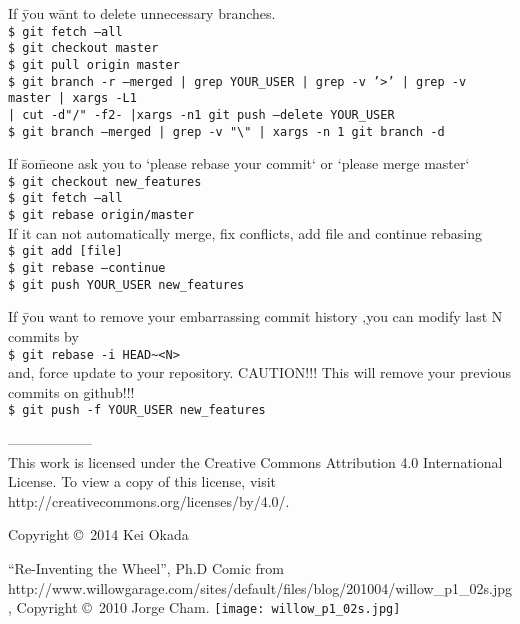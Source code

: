 \documentclass[10pt,landscape]{article}
\begin{document}
\begin{multicols}{2}
\begin{tabbing}
If \=you w\=ant to delete unnecessary branches.\\
\> \texttt{\$ git fetch --all}\\
\> \texttt{\$ git checkout master}\\
\> \texttt{\$ git pull origin master}\\
\> \texttt{\$ git branch -r --merged |  grep YOUR\_USER |  grep -v '>' |  grep -v master |  xargs -L1}\\
\>\> \texttt{|  cut -d"/" -f2- |xargs -n1 git push --delete YOUR\_USER}\\
\> \texttt{\$ git branch --merged | grep -v "\textbackslash *" | xargs -n 1 git branch -d}\\
\end{tabbing}

\begin{tabbing}
If \=so\=meone ask you to `please rebase your commit` or `please merge master`\\
\> \texttt{\$ git checkout new\_features}\\  
\> \texttt{\$ git fetch --all}\\
\> \texttt{\$ git rebase origin/master}\\
If it can not automatically merge, fix conflicts, add file and continue rebasing\\
\> \texttt{\$ git add [file]}\\
\> \texttt{\$ git rebase --continue}\\
\> \texttt{\$ git push YOUR\_USER new\_features}\\  
\end{tabbing}

\begin{tabbing}
If \=you want to remove your embarrassing commit history %
,you can modify last N commits by\\
\> \texttt{\$ git rebase -i HEAD\textasciitilde<N>}\\
and, force update to your repository. CAUTION!!! This will remove your
previous commits on github!!!\\
\> \texttt{\$ git push -f YOUR\_USER new\_features}\\  
\end{tabbing}
------------------\\
\scriptsize
This work is licensed under the Creative Commons Attribution 4.0
International License. To view a copy of this license, visit
http://creativecommons.org/licenses/by/4.0/.

Copyright \copyright\ 2014 Kei Okada

\end{multicols}
\newpage

\begin{center}
``Re-Inventing the Wheel'', Ph.D Comic from
http://www.willowgarage.com/sites/default/files/blog/201004/willow\_p1\_02s.jpg,
Copyright \copyright\ 2010 Jorge Cham.
\texttt{[image: willow\_p1\_02s.jpg]}
\end{center}
\end{document}
